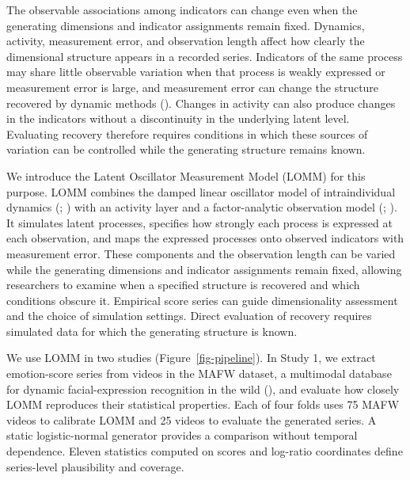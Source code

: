 \documentclass[
]{article}
\begin{document}
The observable associations among indicators can change even when the
generating dimensions and indicator assignments remain fixed. Dynamics,
activity, measurement error, and observation length affect how clearly
the dimensional structure appears in a recorded series. Indicators of
the same process may share little observable variation when that process
is weakly expressed or measurement error is large, and measurement error
can change the structure recovered by dynamic methods
(). Changes in activity can also produce changes in the indicators
without a discontinuity in the underlying latent level. Evaluating
recovery therefore requires conditions in which these sources of
variation can be controlled while the generating structure remains
known.

We introduce the Latent Oscillator Measurement Model (LOMM) for this
purpose. LOMM combines the damped linear oscillator model of
intraindividual dynamics (;
) with an
activity layer and a factor-analytic observation model
(;
). It simulates
latent processes, specifies how strongly each process is expressed at
each observation, and maps the expressed processes onto observed
indicators with measurement error. These components and the observation
length can be varied while the generating dimensions and indicator
assignments remain fixed, allowing researchers to examine when a
specified structure is recovered and which conditions obscure it.
Empirical score series can guide dimensionality assessment and the
choice of simulation settings. Direct evaluation of recovery requires
simulated data for which the generating structure is known.

We use LOMM in two studies (Figure~\ref{fig-pipeline}). In Study 1, we
extract emotion-score series from videos in the MAFW dataset, a
multimodal database for dynamic facial-expression recognition in the
wild (), and evaluate how
closely LOMM reproduces their statistical properties. Each of four folds
uses 75 MAFW videos to calibrate LOMM and 25 videos to evaluate the
generated series. A static logistic-normal generator provides a
comparison without temporal dependence. Eleven statistics computed on
scores and log-ratio coordinates define series-level plausibility and
coverage.
\end{document}

